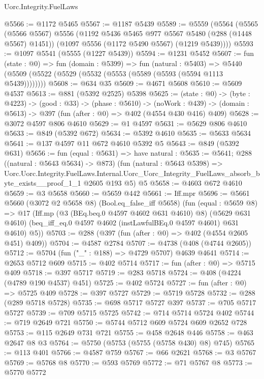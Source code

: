 \begin{lexlean}{Uorc.Integrity.FuelLaws}
\begin{coremodule}
@5566 := @1172 @5465
@5567 := @1187 @5439
@5589 := @5559
    (@5564
      (@5565
        (@5566 @5567)
        @5556
        (@1192 @5436 @5465 @977 @5567 @5480 (@288 (@1448 @5567) @1451))
        (@1097 @5556 (@1172 @5490 @5567) (@1219 @5439))))
@5593 := @1097 @5541 (@5555 (@1227 @5439))
@5594 := @1231 @5452
@5607 := fun (state : @0) =>
  fun (domain : @5399) =>
  fun (natural : @5403) =>
  @5440 (@5509 (@5522 (@5529 (@5532 (@5553 (@5589 (@5593 (@5594 @1113 @5439))))))))
@5608 := @634 @35
@5609 := @4671 @5608
@5610 := @5609 @4537
@5613 := @881 (@5392 @2525) @5398
@5625 := (state : @0) ->
  (byte : @4223) ->
  (good : @33) ->
  (phase : @5610) ->
  (noWork : @439) -> (domain : @5613) -> @397 (fun (after : @0) => @402 (@4554 @430 @416) @409)
@5628 := @3072 @4597 @806 @4610
@5629 := @1 @4597
@5631 := @5629 @806 @4610
@5633 := @849 (@5392 @672)
@5634 := @5392 @4610
@5635 := @5633 @5634
@5641 := @137 @4597 @11 @672 @4610 @5392 @5
@5643 := @849 (@5392 @631)
@5656 := fun (equal : @5631) =>
  have natural : @5635 := @5641;
  @288
    ((natural : @5643 @5634) -> @873)
    (fun (natural : @5643 @5398) =>
    Uorc.Uorc.Integrity.FuelLaws.Internal.Uorc_Uorc_Integrity_FuelLaws_absorb_byte_exists__proof_1_1
      @2605
      @193
      @5)
    @5
@5658 := @4603 @672 @4610
@5659 := @3 @5658
@5660 := @5659 @442
@5661 := Iff.mpr
@5696 := @5661
    @5660
    (@3072 @2 @5658 @8)
    (Bool.eq_false_iff @5658)
    (fun (equal : @5659 @8) =>
    @17
      (Iff.mp
        (@3 (BEq.beq.{0} @4597 @4602 @631 @4610) @8)
        (@5629 @631 @4610)
        (beq_iff_eq.{0} @4597 @4602 (instLawfulBEq.{0} @4597 @4601) @631 @4610)
        @5))
@5703 := @288 (@397 (fun (after : @0) => @402 (@4554 @2605 @451) @409))
@5704 := @4587 @2784
@5707 := @4738 (@408 (@4744 @2605))
@5712 := @5704 (fun ("_" : @188) => @4729 @5707) @4639 @4641
@5714 := @2653 @5712 @609
@5715 := @402 @5714
@5717 := fun (after : @0) => @5715 @409
@5718 := @397 @5717
@5719 := @283 @5718
@5724 := @408 (@4224 (@4789 @190 @4537) @451)
@5725 := @402 @5724
@5727 := fun (after : @0) => @5725 @409
@5728 := @397 @5727
@5729 := @5719 @5728
@5732 := @288 (@289 @5718 @5728)
@5735 := @698 @5717 @5727 @397
@5737 := @705 @5717 @5727
@5739 := @709 @5715 @5725
@5742 := @714 @5714 @5724 @402
@5744 := @719 @2649 @721
@5750 := @5744 @5712 @609 @5724 @609 @2652 @728
@5753 := @115 @2649 @731 @721
@5755 := @458 @2648 @446
@5758 := @463 @2647 @8 @3
@5764 := @5750 (@5753 (@5755 (@5758 @430) @8) @745)
@5765 := @113 @401
@5766 := @4587 @759
@5767 := @66 @2621
@5768 := @3 @5767
@5769 := @5768 @8
@5770 := @593 @5769
@5772 := @71 @5767 @8
@5773 := @5770 @5772

\end{coremodule}
\end{lexlean}

